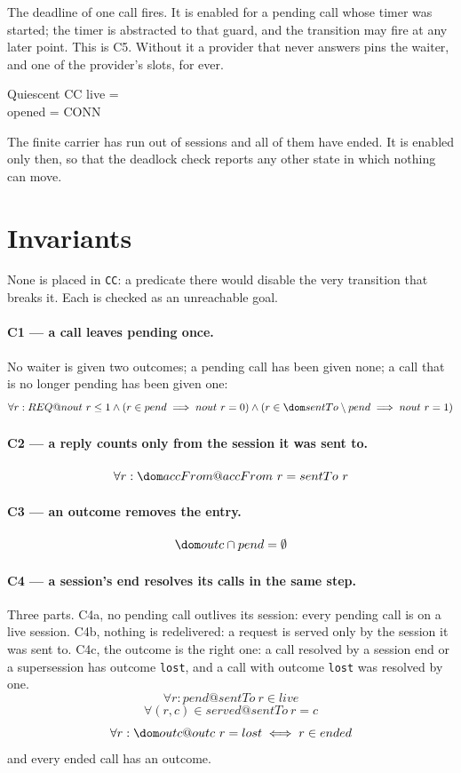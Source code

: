 \documentclass[a4paper,10pt,fleqn]{article}
\begin{document}
The deadline of one call fires.  It is enabled for a pending call whose timer
was started; the timer is abstracted to that guard, and the transition may
fire at any later point.  This is C5.  Without it a provider that never
answers pins the waiter, and one of the provider's slots, for ever.

\begin{schema}{Quiescent}
  \Xi CC
\where
  live = \emptyset \\
  opened = CONN
\end{schema}

The finite carrier has run out of sessions and all of them have ended.  It
is enabled only then, so that the deadlock check reports any other state in
which nothing can move.

\section{Invariants}
\label{sec:inv}

None is placed in \texttt{CC}: a predicate there would disable the very
transition that breaks it.  Each is checked as an unreachable goal.

\paragraph{C1 --- a call leaves pending once.}
No waiter is given two outcomes; a pending call has been given none; a call
that is no longer pending has been given one:
\[
  \forall r : REQ @ nout~r \leq 1 \land (r \in pend \implies nout~r = 0)
    \land (r \in \dom sentTo \setminus pend \implies nout~r = 1)
\]

\paragraph{C2 --- a reply counts only from the session it was sent to.}
\[
  \forall r : \dom accFrom @ accFrom~r = sentTo~r
\]

\paragraph{C3 --- an outcome removes the entry.}
\[
  \dom outc \cap pend = \emptyset
\]

\paragraph{C4 --- a session's end resolves its calls in the same step.}
Three parts.  C4a, no pending call outlives its session: every pending call
is on a live session.  C4b, nothing is redelivered: a request is served only
by the session it was sent to.  C4c, the outcome is the right one: a call
resolved by a session end or a supersession has outcome \texttt{lost}, and a
call with outcome \texttt{lost} was resolved by one.
\[
  \forall r : pend @ sentTo~r \in live
\]
\[
  \forall (r , c) \in served @ sentTo~r = c
\]
\[
  \forall r : \dom outc @ outc~r = lost \iff r \in ended
\]
and every ended call has an outcome.
\end{document}
